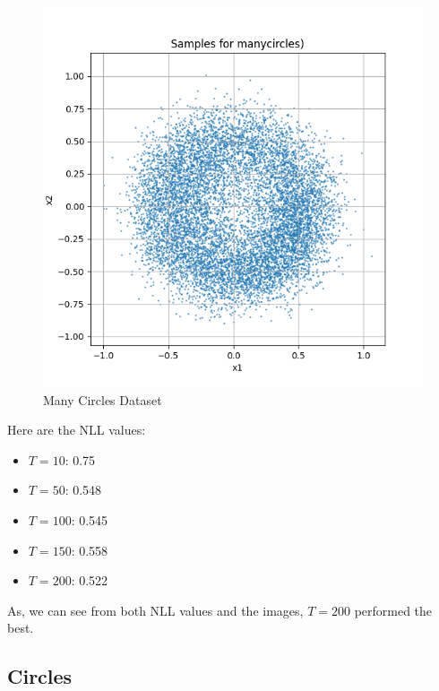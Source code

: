 \documentclass[a4paper,12pt]{article}
\begin{document}
\begin{figure}[H]
\begin{minipage}{0.3\textwidth}
  \end{minipage}
  \begin{minipage}{0.3\textwidth}
      \centering
      \includegraphics[width=\linewidth]{"images/Samples for ddpm_2_200_0.0001_0.02_manycircles.png"}
  \end{minipage}

  \caption{Many Circles Dataset}
\end{figure}

Here are the NLL values:
\begin{itemize}
  \item $T = 10$: 0.75
  \item $T = 50$: 0.548
  \item $T = 100$: 0.545
  \item $T = 150$: 0.558
  \item $T = 200$: 0.522
\end{itemize}

As, we can see from both NLL values and the images, $T = 200$ performed the best.

\clearpage

\subsection*{Circles}
\end{document}
